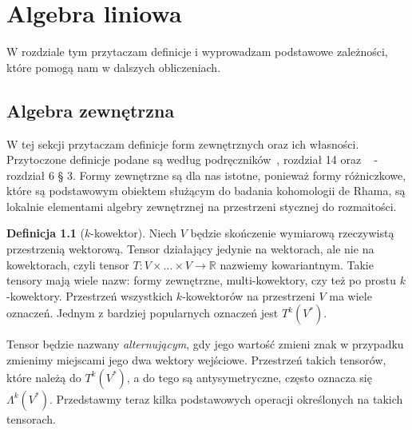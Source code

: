 \documentclass[licencjacka]{pracamgr}
\theoremstyle{definition}
\newtheorem{definition}{Definicja}[section]
\theoremstyle{definition}
\theoremstyle{plain}
\theoremstyle{plain}
\theoremstyle{plain}
\theoremstyle{plain}
\theoremstyle{plain}
\begin{document}


\chapter{Algebra liniowa}
W rozdziale tym przytaczam definicje i wyprowadzam podstawowe zależności, które
pomogą nam w dalszych obliczeniach. \\


\section{Algebra zewnętrzna}\label{exterior-algebra-chapter}
W tej sekcji przytaczam definicje form zewnętrznych oraz ich własności. 
 Przytoczone
definicje podane są według podręczników~\cite{lee}, rozdział 14 oraz
~\cite{kostrikin} - rozdział 6 § 3. 
Formy zewnętrzne są dla nas istotne, ponieważ formy różniczkowe, które 
są podstawowym obiektem służącym do badania kohomologii de Rhama, 
są lokalnie elementami algebry zewnętrznej na przestrzeni stycznej
do rozmaitości. \\

\begin{definition}[$k$-kowektor]
Niech $V$ będzie skończenie wymiarową rzeczywistą przestrzenią wektorową.
Tensor działający jedynie na wektorach, ale nie na kowektorach, czyli tensor 
$T:V \times ... \times V \rightarrow \mathbb{R}$ nazwiemy kowariantnym.
Takie tensory mają wiele nazw: formy zewnętrzne,
multi-kowektory, czy też po prostu $k$-kowektory.  Przestrzeń wszystkich
$k$-kowektorów na przestrzeni $V$ ma wiele oznaczeń.  Jednym z bardziej
popularnych oznaczeń jest $T^k (V^\ast)$. 
\end{definition}
Tensor będzie nazwany \emph{alternującym}, gdy jego wartość zmieni znak w
przypadku zmienimy miejscami jego dwa wektory wejściowe.  Przestrzeń takich
tensorów, które należą do $T^k (V^\ast)$, a do tego są antysymetryczne, często
oznacza się $\Lambda^k (V^\ast)$.  Przedstawmy teraz kilka podstawowych
operacji określonych na takich tensorach. \\
\end{document}
